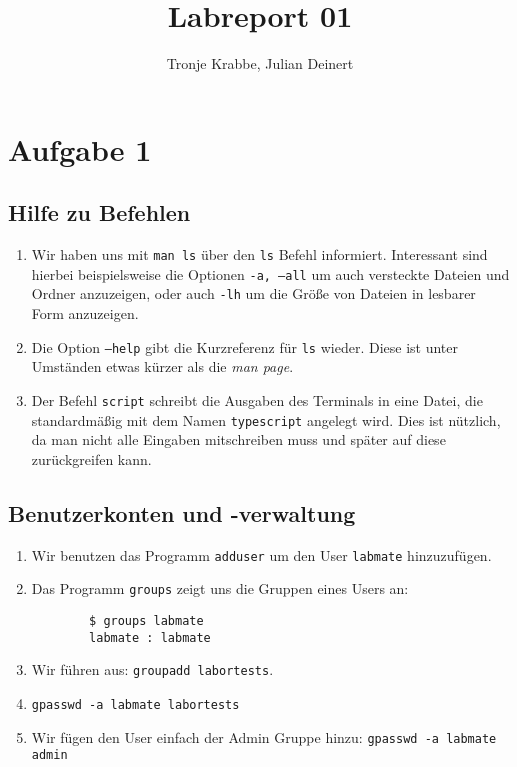 \documentclass[12pt,a4paper]{article}
\author{Tronje Krabbe, Julian Deinert}
\title{Labreport 01}
\begin{document}
\maketitle
\tableofcontents
\newpage


\section*{Aufgabe 1}
\subsection{Hilfe zu Befehlen}
\begin{enumerate}

\item
Wir haben uns mit \texttt{man ls} über den \texttt{ls} Befehl informiert.
Interessant sind hierbei beispielsweise die Optionen \texttt{-a, ---all} um auch versteckte Dateien und Ordner anzuzeigen, oder auch \texttt{-lh} um die Größe von Dateien in lesbarer Form anzuzeigen.
\item
Die Option \texttt{---help} gibt die Kurzreferenz für \texttt{ls} wieder. Diese ist unter Umständen etwas kürzer als die \textit{man page}.
\item
Der Befehl \texttt{script} schreibt die Ausgaben des Terminals in eine Datei, die standardmäßig mit dem Namen \texttt{typescript} angelegt wird. Dies ist nützlich, da man nicht alle Eingaben mitschreiben muss und später auf diese zurückgreifen kann.
\end{enumerate}
\subsection{Benutzerkonten und -verwaltung}
\begin{enumerate}
    \item Wir benutzen das Programm \texttt{adduser} um den User \texttt{labmate} hinzuzufügen.
    \item Das Programm \texttt{groups} zeigt uns die Gruppen eines Users an:
        \begin{verbatim}
        $ groups labmate
        labmate : labmate
        \end{verbatim}
    \item Wir führen aus: \texttt{groupadd labortests}.
    \item \texttt{gpasswd -a labmate labortests}
    \item Wir fügen den User einfach der Admin Gruppe hinzu: \texttt{gpasswd -a labmate admin}
\end{enumerate}
\end{document}
